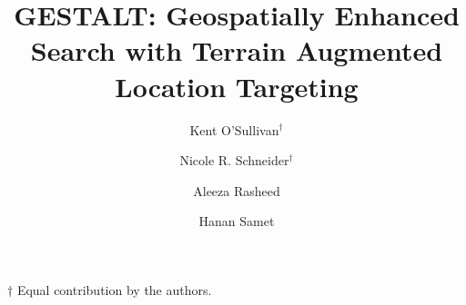 \documentclass[sigconf]{acmart}
\begin{document}


\graphicspath{ {figures/}{auto_commit_fig/}{auto_fig/} }

\newcommand{\latexfile}[1]{}

\newcommand{\pinaforecomment}[4]{\colorbox{#1}{\textcolor{#4}{\parbox{.8\linewidth}{#2: #3}}}}
\newcommand{\osullikomment}[1]{\pinaforecomment{green}{Kent}{#1}{black}}
\newcommand{\nrscomment}[1]{\pinaforecomment{violet}{Nicole}{#1}{white}}

\newcommand\blankpage{%
    \null
    \thispagestyle{empty}%
    \addtocounter{page}{-1}%
    \newpage}



\title{GESTALT: Geospatially Enhanced Search with Terrain Augmented Location Targeting}%

\author{Kent O'Sullivan{$^\dagger$}}

\author{Nicole R. Schneider$^\dagger$}

\author{Aleeza Rasheed}

\author{Hanan Samet}



\begin{abstract}
\latexfile{00_Abstract.tex}
\end{abstract}

\maketitle
$\dagger$ Equal contribution by the authors. 
\end{document}
